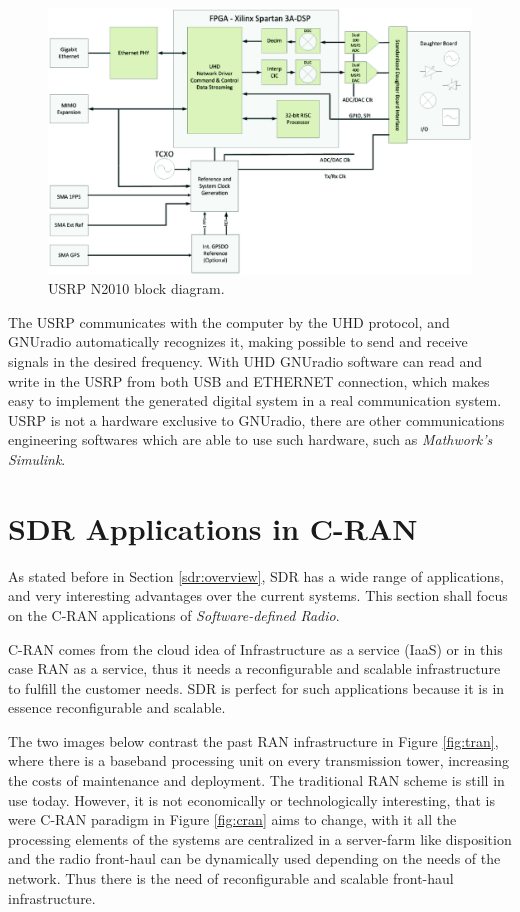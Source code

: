 \begin{figure}[htbp]
    \centering
    \includegraphics[width=.85\textwidth]{./figures/usrp_bd}
    \caption{ USRP N2010 block diagram.
    \label{fig:usrpbd}}
\end{figure}

The USRP communicates with the computer by the UHD protocol, and GNUradio
automatically recognizes it, making possible to send and receive signals in the
desired frequency. With UHD GNUradio software can read and write in the USRP
from both USB and ETHERNET connection, which makes easy to implement the
generated digital system in a real communication system. USRP is not a hardware
exclusive to GNUradio, there are other communications engineering softwares
which are able to use such hardware, such as \textit{Mathwork's Simulink}.

\section{SDR Applications in C-RAN}
\label{sec:sdr_app}

As stated before in Section \ref{sdr:overview}, SDR has a wide range of applications,
and very interesting advantages over the current systems. This section shall focus
on the C-RAN applications of \emph{Software-defined Radio}.

C-RAN comes from the cloud idea of Infrastructure as a service (IaaS) or in this
case RAN as a service, thus it needs a reconfigurable and scalable
infrastructure to fulfill the customer needs. SDR is perfect for such
applications because  it is in essence reconfigurable and scalable.

The two images below contrast the past RAN infrastructure in Figure
\ref{fig:tran}, where there is a baseband processing unit on every transmission
tower, increasing the costs of maintenance and deployment. The traditional RAN
scheme is still in use today. However, it is not economically or technologically
interesting, that is were C-RAN paradigm in Figure \ref{fig:cran} aims to
change, with it all the processing elements of the systems are centralized in a
server-farm like disposition and the radio front-haul can be dynamically used
depending on the needs of the network. Thus there is the need of reconfigurable
and scalable front-haul infrastructure.


